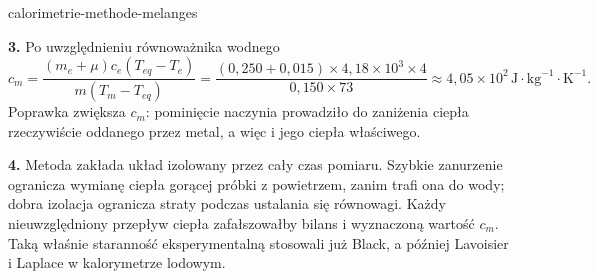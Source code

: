 \begin{exo}{calorimetrie-methode-melanges}
\begin{solution}
\textbf{3.} Po uwzględnieniu równoważnika wodnego
\[
c_m=\frac{(m_e+\mu)c_e(T_{eq}-T_e)}{m(T_m-T_{eq})}
=\frac{(0{,}250+0{,}015)\times4{,}18\times10^3\times4}{0{,}150\times73}
\approx4{,}05\times10^2\,\text{J}\!\cdot\!\text{kg}^{-1}\!\cdot\!\text{K}^{-1}.
\]
Poprawka zwiększa $c_m$: pominięcie naczynia prowadziło do zaniżenia ciepła rzeczywiście oddanego przez metal, a więc i jego ciepła właściwego.

\textbf{4.} Metoda zakłada układ izolowany przez cały czas pomiaru. Szybkie zanurzenie ogranicza wymianę ciepła gorącej próbki z powietrzem, zanim trafi ona do wody; dobra izolacja ogranicza straty podczas ustalania się równowagi. Każdy nieuwzględniony przepływ ciepła zafałszowałby bilans i wyznaczoną wartość $c_m$. Taką właśnie staranność eksperymentalną stosowali już Black, a później Lavoisier i Laplace w kalorymetrze lodowym.
\end{solution}
\end{exo}

